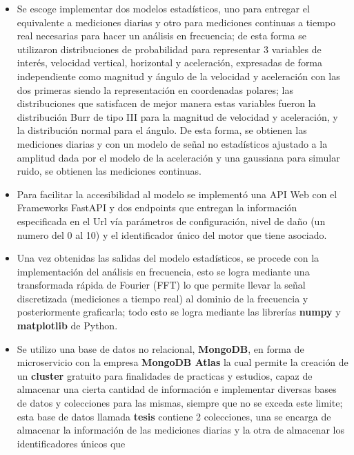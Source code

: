 \begin{itemize}
    \item Se escoge implementar dos modelos estadísticos, uno para entregar el
        equivalente a mediciones diarias y otro para mediciones continuas a tiempo
        real necesarias para hacer un análisis en frecuencia; de esta forma se
        utilizaron distribuciones de probabilidad para representar 3 variables de interés,
        velocidad vertical, horizontal y aceleración, expresadas de forma independiente
        como magnitud y ángulo de la velocidad y aceleración con las dos primeras
        siendo la representación en coordenadas polares; las distribuciones que
        satisfacen de mejor manera estas variables fueron la distribución Burr
        de tipo III para la magnitud de velocidad y aceleración, y la distribución
        normal para el ángulo. De esta forma, se obtienen las mediciones diarias
        y con un modelo de señal no estadísticos ajustado a la amplitud dada por
        el modelo de la aceleración y una gaussiana para simular ruido, se obtienen
        las mediciones continuas.
    \item Para facilitar la accesibilidad al modelo se implementó una API Web con
        el Frameworks FastAPI y dos endpoints que entregan la información especificada
        en el Url vía parámetros de configuración, nivel de daño (un numero del 0 al 10)
        y el identificador único del motor que tiene asociado.
    \item Una vez obtenidas las salidas del modelo estadísticos, se procede con
        la implementación del análisis en frecuencia, esto se logra mediante una
        transformada rápida de Fourier (FFT) lo que permite llevar la señal
        discretizada (mediciones a tiempo real) al dominio de la frecuencia
        y posteriormente graficarla; todo esto se logra mediante las librerías
        \textbf{numpy} y \textbf{matplotlib} de Python.
    \item  Se utilizo una base de datos no relacional, \textbf{MongoDB}, en forma
        de microservicio con la empresa \textbf{MongoDB Atlas} la cual permite
        la creación de un \textbf{cluster} gratuito para finalidades de practicas
        y estudios, capaz de almacenar una cierta cantidad de información e
        implementar diversas bases de datos y colecciones para las mismas, siempre
        que no se exceda este limite; esta base de datos llamada \textbf{tesis}
        contiene 2 colecciones, una se encarga de almacenar la información de las
        mediciones diarias y la otra de almacenar los identificadores únicos que

\end{itemize}
